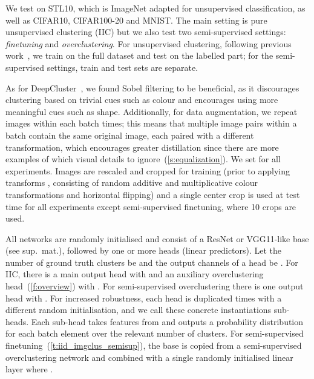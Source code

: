 \documentclass[10pt,twocolumn,letterpaper]{article}
\makeatletter
\newcommand{\methodnameshort}{IIC\xspace}
\renewcommand{\paragraph}{\@startsection{paragraph}{4}{\z@}{0.5em}{-1em}{\normalfont\normalsize\bfseries}}
\makeatother
\begin{document}
 

\paragraph{Datasets.}

We test on STL10, which is ImageNet adapted for unsupervised classification, as well as CIFAR10, CIFAR100-20 and MNIST. The main setting is pure unsupervised clustering (\methodnameshort) but we also test two semi-supervised settings: \emph{finetuning} and \emph{overclustering}.
For unsupervised clustering, following previous work~\cite{chang2017deep,xie2016unsupervised,yang2016joint}, we train on the full dataset and test on the labelled part; for the semi-supervised settings, train and test sets are separate.



As for DeepCluster~\cite{caron2018deep}, we found Sobel filtering to be beneficial, as it discourages clustering based on trivial cues such as colour and encourages using more meaningful cues such as shape.
Additionally, for data augmentation, we repeat images within each batch  times; this means that multiple image pairs within a batch contain the same original image, each paired with a different transformation, which encourages greater distillation since there are more examples of which visual details to ignore~(\cref{s:equalization}).
We set  for all experiments. Images are rescaled and cropped for training (prior to applying transforms , consisting of random additive and multiplicative colour transformations and horizontal flipping) and a single center crop is used at test time for all experiments except semi-supervised finetuning, where 10 crops are used.

\paragraph{Architecture.}
All networks are randomly initialised and consist of a ResNet or VGG11-like base  (see sup.\ mat.), followed by one or more heads (linear predictors).
Let the number of ground truth clusters be  and the output channels of a head be .
For \methodnameshort, there is a main output head with  and an auxiliary overclustering head~(\cref{f:overview}) with .
For semi-supervised overclustering there is one output head with .
For increased robustness, each head is duplicated  times with a different random initialisation, and we call these concrete instantiations sub-heads.
Each sub-head takes features from  and outputs a probability distribution for each batch element over the relevant number of clusters.
For semi-supervised finetuning~(\cref{t:iid_imgclus_semisup}), the base is copied from a semi-supervised overclustering network and combined with a single randomly initialised linear layer where .
\end{document}
